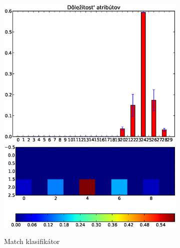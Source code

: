 \begin{figure}[htp]
        \centering
        \begin{subfigure}[t]{0.4\textwidth}
                \includegraphics[width=\textwidth]{images/clf_fi/randomforest_combined_5_bars}
                \includegraphics[width=\textwidth]{images/clf_fi/randomforest_combined_5_heatmap}
                \caption{Match klasifikátor}
                \label{fig:datatype4-m}
        \end{subfigure}%
        \qquad\qquad %
        \begin{subfigure}[t]{0.4\textwidth}

\end{subfigure}
\end{figure}
